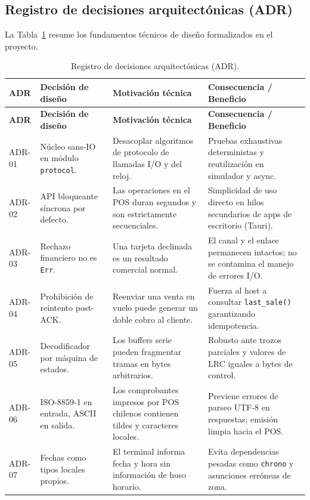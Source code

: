 \documentclass{../../plantilla/raysac-informe}
\begin{document}
\subsection{Registro de decisiones arquitectónicas (ADR)}
La Tabla~\ref{tab:adr-resumen} resume los fundamentos técnicos de diseño formalizados en el proyecto.

\begin{longtable}{@{}p{1.4cm}p{4.0cm}p{4.2cm}p{4.8cm}@{}}
\caption{Registro de decisiones arquitectónicas (ADR).}\label{tab:adr-resumen}\\
\toprule
\textbf{ADR} & \textbf{Decisión de diseño} & \textbf{Motivación técnica} & \textbf{Consecuencia / Beneficio} \\
\midrule
\endfirsthead
\toprule
\textbf{ADR} & \textbf{Decisión de diseño} & \textbf{Motivación técnica} & \textbf{Consecuencia / Beneficio} \\
\midrule
\endhead
\bottomrule
\endlastfoot
ADR-01 & Núcleo sans-IO en módulo \texttt{protocol}. & Desacoplar algoritmos de protocolo de llamadas I/O y del reloj. & Pruebas exhaustivas deterministas y reutilización en simulador y async. \\
ADR-02 & API bloqueante síncrona por defecto. & Las operaciones en el POS duran segundos y son estrictamente secuenciales. & Simplicidad de uso directo en hilos secundarios de apps de escritorio (Tauri). \\
ADR-03 & Rechazo financiero no es \texttt{Err}. & Una tarjeta declinada es un resultado comercial normal. & El canal y el enlace permanecen intactos; no se contamina el manejo de errores I/O. \\
ADR-04 & Prohibición de reintento post-ACK. & Reenviar una venta en vuelo puede generar un doble cobro al cliente. & Fuerza al host a consultar \texttt{last\_sale()} garantizando idempotencia. \\
ADR-05 & Decodificador por máquina de estados. & Los buffers serie pueden fragmentar tramas en bytes arbitrarios. & Robusto ante trozos parciales y valores de LRC iguales a bytes de control. \\
ADR-06 & ISO-8859-1 en entrada, ASCII en salida. & Los comprobantes impresos por POS chilenos contienen tildes y caracteres locales. & Previene errores de parseo UTF-8 en respuestas; emisión limpia hacia el POS. \\
ADR-07 & Fechas como tipos locales propios. & El terminal informa fecha y hora sin información de huso horario. & Evita dependencias pesadas como \texttt{chrono} y asunciones erróneas de zona. \\

\end{longtable}
\end{document}
